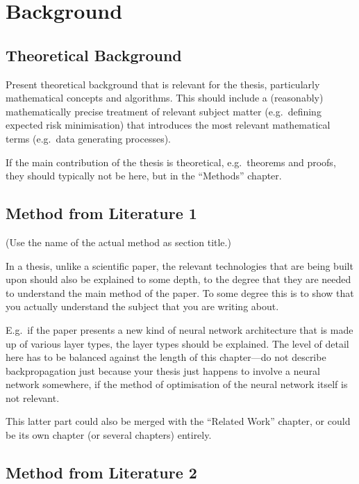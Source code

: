 \chapter{Background}\label{chap:background}

\section{Theoretical Background}

Present theoretical background that is relevant for the thesis, particularly mathematical concepts and algorithms.
This should include a (reasonably) mathematically precise treatment of relevant subject matter (e.g.\ defining expected risk minimisation) that introduces the most relevant mathematical terms (e.g.\ data generating processes).

If the main contribution of the thesis is theoretical, e.g.\ theorems and proofs, they should typically not be here, but in the ``Methods'' chapter.

\section{Method from Literature 1}

(Use the name of the actual method as section title.)

In a thesis, unlike a scientific paper, the relevant technologies that are being built upon should also be explained to some depth, to the degree that they are needed to understand the main method of the paper.
To some degree this is to show that you actually understand the subject that you are writing about.

E.g.\ if the paper presents a new kind of neural network architecture that is made up of various layer types, the layer types should be explained.
The level of detail here has to be balanced against the length of this chapter---do not describe backpropagation just because your thesis just happens to involve a neural network somewhere, if the method of optimisation of the neural network itself is not relevant.

This latter part could also be merged with the ``Related Work'' chapter, or could be its own chapter (or several chapters) entirely.

\section{Method from Literature 2}

